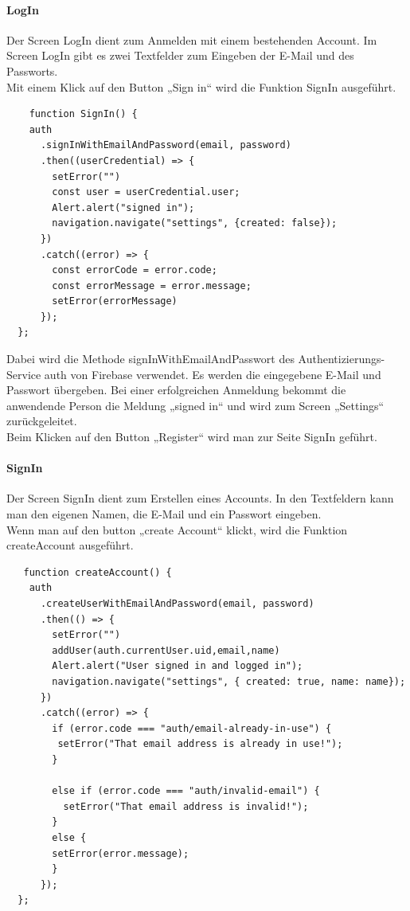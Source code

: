 \paragraph{LogIn}Der Screen LogIn dient zum Anmelden mit einem bestehenden Account. Im Screen LogIn gibt es zwei Textfelder zum Eingeben der E-Mail und des Passworts. \\
Mit einem Klick auf den Button „Sign in“ wird die Funktion SignIn ausgeführt. \\
\begin{verbatim}
    function SignIn() {
    auth
      .signInWithEmailAndPassword(email, password)
      .then((userCredential) => {
        setError("")
        const user = userCredential.user;
        Alert.alert("signed in");
        navigation.navigate("settings", {created: false});
      })
      .catch((error) => {
        const errorCode = error.code;
        const errorMessage = error.message;
        setError(errorMessage)
      });
  };
\end{verbatim}

Dabei wird die Methode signInWithEmailAndPasswort des Authentizierungs-Service auth von Firebase verwendet. Es werden die eingegebene E-Mail und Passwort übergeben. Bei einer erfolgreichen Anmeldung bekommt die anwendende Person die Meldung „signed in“ und wird zum Screen „Settings“ zurückgeleitet.\\
Beim Klicken auf den Button „Register“ wird man zur Seite SignIn geführt.\\


\paragraph{SignIn}Der Screen SignIn dient zum Erstellen eines Accounts. In den Textfeldern kann man den eigenen Namen, die E-Mail und ein Passwort eingeben.\\
Wenn man auf den button „create Account“ klickt, wird die Funktion createAccount ausgeführt.\\
\begin{verbatim}
   function createAccount() {
    auth
      .createUserWithEmailAndPassword(email, password)
      .then(() => {
        setError("")
        addUser(auth.currentUser.uid,email,name)
        Alert.alert("User signed in and logged in");
        navigation.navigate("settings", { created: true, name: name});
      })
      .catch((error) => {
        if (error.code === "auth/email-already-in-use") {
         setError("That email address is already in use!");
        }

        else if (error.code === "auth/invalid-email") {
          setError("That email address is invalid!");
        }
        else {
        setError(error.message);
        }
      });
  };
\end{verbatim}

